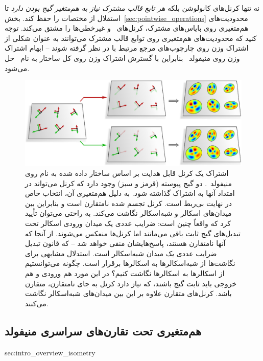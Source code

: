 نه تنها کرنل‌های کانولوشن بلکه \emph{هر تابع قالب مشترک نیاز به هم‌متغیر گیج بودن دارد} تا استقلال از مختصات \lr{$\GM$} را حفظ کند.
بخش~\ref{sec:pointwise_operations} محدودیت‌های هم‌متغیری روی بایاس‌های مشترک، کرنل‌های \onexone\ و غیرخطی‌ها را مشتق می‌کند.
توجه کنید که محدودیت‌های هم‌متغیری روی توابع قالب مشترک می‌توانند به عنوان شکلی از اشتراک وزن روی چارچوب‌های مرجع مرتبط با  در نظر گرفته شوند
-- ابهام اشتراک وزن روی منیفولد~ بنابراین با گسترش اشتراک وزن روی کل ساختار  به نام~\lr{$\GM$} حل می‌شود.



\begin{figure}
	\centering
	\includegraphics[width=1.\textwidth]{figures/intro_kernel_alignment_reflect.pdf}
	\caption{\small
		اشتراک یک کرنل قابل هدایت \lr{$\Flip$} بر اساس ساختار \lr{$\Flip$} داده شده به نام \lr{$\RM$} روی منیفولد~.
		دو گیج پیوسته (قرمز و سبز) وجود دارد که کرنل می‌تواند در امتداد آنها به اشتراک گذاشته شود.
		به دلیل هم‌متغیری \lr{$\Flip$} آن، انتخاب خاص در نهایت بی‌ربط است.
		کرنل تجسم شده نامتقارن است و بنابراین بین میدان‌های اسکالر و شبه‌اسکالر نگاشت می‌کند.
		به راحتی می‌توان تأیید کرد که واقعاً چنین است:
		ضرایب عددی یک میدان ورودی اسکالر تحت تبدیل‌های گیج ثابت باقی می‌مانند اما کرنل‌ها منعکس می‌شوند.
		از آنجا که آنها نامتقارن هستند، پاسخ‌هایشان منفی خواهد شد -- که قانون تبدیل ضرایب عددی یک میدان شبه‌اسکالر است.
		استدلال مشابهی برای نگاشت‌ها از شبه‌اسکالرها به اسکالرها برقرار است.
		چگونه می‌توانستیم از اسکالرها به اسکالرها نگاشت کنیم؟
		در این مورد هم ورودی و هم خروجی باید ثابت گیج باشند، که نیاز دارد کرنل به جای نامتقارن، متقارن باشد.
		کرنل‌های متقارن علاوه بر این بین میدان‌های شبه‌اسکالر نگاشت می‌کنند.
	}
	\label{fig:intro_kernel_alignment_reflect}
\end{figure}




\toclesslab\subsection{هم‌متغیری تحت تقارن‌های سراسری منیفولد}{sec:intro_overview_isometry}

